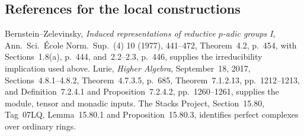 \subsection{References for the local constructions}
Bernstein--Zelevinsky, \emph{Induced representations of reductive
$p$-adic groups I}, Ann.\ Sci.\ \'Ecole Norm.\ Sup.\ (4) 10 (1977),
441--472, Theorem~4.2, p.~454, with Sections~1.8(a), p.~444,
and~2.2--2.3, p.~446, supplies the irreducibility implication used above.
Lurie, \emph{Higher Algebra}, September~18, 2017, Sections~4.8.1--4.8.2,
Theorem~4.7.3.5, p.~685, Theorem~7.1.2.13, pp.~1212--1213,
and Definition~7.2.4.1 and Proposition~7.2.4.2, pp.~1260--1261,
supplies the module, tensor and monadic inputs. The Stacks Project,
Section~15.80, Tag~07LQ, Lemma~15.80.1 and Proposition~15.80.3,
identifies perfect complexes over ordinary rings.

